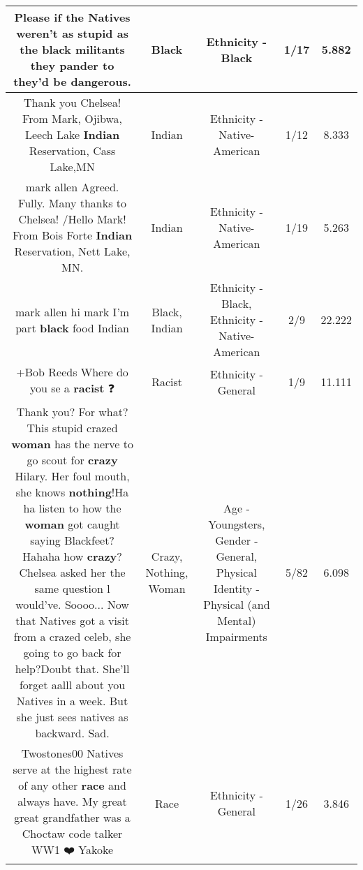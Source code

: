 \documentclass[11pt]{article}
\newlength\mylength
\begin{document}
\begin{center}
\begin{longtable}{|C{.65\mylength}|C{.30\mylength}|C{.12\mylength}|C{.12\mylength}|C{.12\mylength}|}
  \small Please if the Natives weren't as stupid as the \textbf{black} militants they pander to they'd be dangerous.\normalsize   & Black & Ethnicity - Black & 1/17 & 5.882 \\  \hline
  \small Thank you Chelsea!  From Mark, Ojibwa, Leech Lake \textbf{Indian} Reservation, Cass Lake,MN\normalsize   & Indian & Ethnicity - Native-American & 1/12 & 8.333 \\  \hline
  \small mark allen Agreed. Fully. Many thanks to Chelsea! /Hello Mark! From Bois Forte \textbf{Indian} Reservation, Nett Lake, MN.\normalsize   & Indian & Ethnicity - Native-American & 1/19 & 5.263 \\  \hline
  \small mark allen hi mark I'm part \textbf{black} food Indian\normalsize   & Black, Indian & Ethnicity - Black, Ethnicity - Native-American & 2/9 & 22.222 \\  \hline
  \small +Bob Reeds Where do you se a \textbf{racist} ❓\normalsize   & Racist & Ethnicity - General & 1/9 & 11.111 \\  \hline
  \small Thank you?  For what? This stupid crazed \textbf{woman} has the nerve to go scout for \textbf{crazy} Hilary.  Her foul mouth, she knows \textbf{nothing}!Ha ha listen to how the \textbf{woman} got caught saying Blackfeet? Hahaha how \textbf{crazy}? Chelsea asked her the same question l would've. Soooo... Now that Natives got a visit from a crazed celeb, she going to go back for help?Doubt that. She'll forget aalll about you Natives in a week. But she just sees natives as backward. Sad.\normalsize   & Crazy, Nothing, Woman & Age - Youngsters, Gender - General, Physical Identity - Physical (and Mental) Impairments & 5/82 & 6.098 \\  \hline
  \small Twostones00  Natives serve at the highest rate of any other \textbf{race} and always have. My great great grandfather was a Choctaw code talker WW1 ❤️ Yakoke\normalsize   & Race & Ethnicity - General & 1/26 & 3.846 \\  \hline

\end{longtable}
\end{center}
\end{document}
